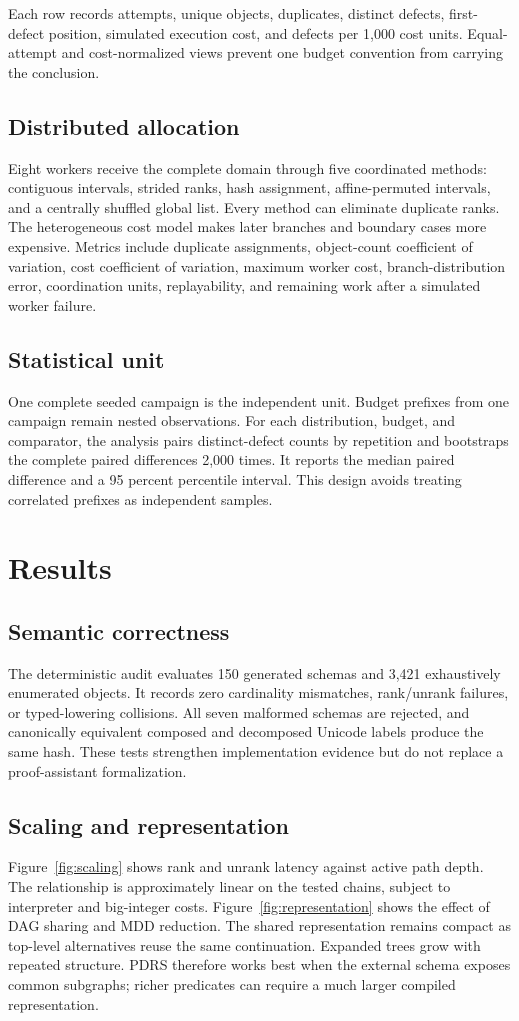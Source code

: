 \documentclass[10pt]{article}
\begin{document}
Each row records attempts, unique objects, duplicates, distinct defects, first-defect position, simulated execution cost, and defects per 1,000 cost units. Equal-attempt and cost-normalized views prevent one budget convention from carrying the conclusion.

\subsection{Distributed allocation}
Eight workers receive the complete domain through five coordinated methods: contiguous intervals, strided ranks, hash assignment, affine-permuted intervals, and a centrally shuffled global list. Every method can eliminate duplicate ranks. The heterogeneous cost model makes later branches and boundary cases more expensive. Metrics include duplicate assignments, object-count coefficient of variation, cost coefficient of variation, maximum worker cost, branch-distribution error, coordination units, replayability, and remaining work after a simulated worker failure.

\subsection{Statistical unit}
One complete seeded campaign is the independent unit. Budget prefixes from one campaign remain nested observations. For each distribution, budget, and comparator, the analysis pairs distinct-defect counts by repetition and bootstraps the complete paired differences 2,000 times. It reports the median paired difference and a 95 percent percentile interval. This design avoids treating correlated prefixes as independent samples.

\section{Results}
\subsection{Semantic correctness}
The deterministic audit evaluates 150 generated schemas and 3,421 exhaustively enumerated objects. It records zero cardinality mismatches, rank/unrank failures, or typed-lowering collisions. All seven malformed schemas are rejected, and canonically equivalent composed and decomposed Unicode labels produce the same hash. These tests strengthen implementation evidence but do not replace a proof-assistant formalization.

\subsection{Scaling and representation}
Figure~\ref{fig:scaling} shows rank and unrank latency against active path depth. The relationship is approximately linear on the tested chains, subject to interpreter and big-integer costs. Figure~\ref{fig:representation} shows the effect of DAG sharing and MDD reduction. The shared representation remains compact as top-level alternatives reuse the same continuation. Expanded trees grow with repeated structure. PDRS therefore works best when the external schema exposes common subgraphs; richer predicates can require a much larger compiled representation.
\end{document}
